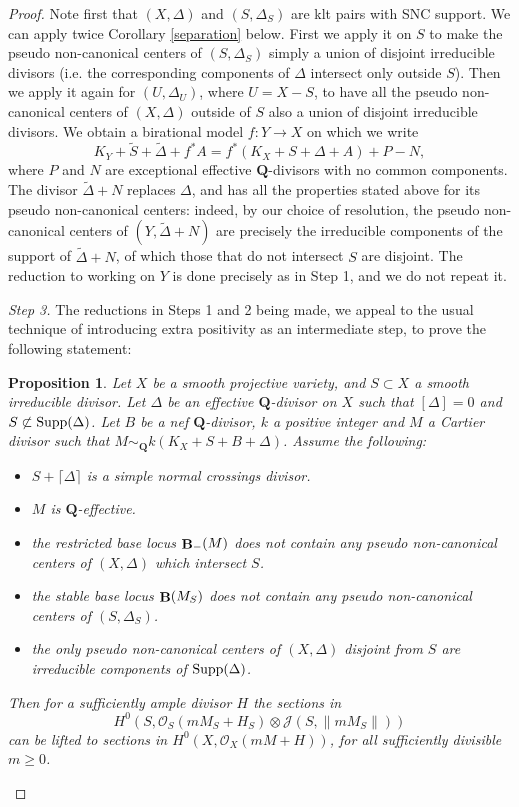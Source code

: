 \documentclass[11pt]{amsart}
\theoremstyle{plain}
\newtheorem{proposition}[theorem]{Proposition}
\theoremstyle{definition}
\newcommand{\QQ}{\mathbf{Q}}
\newcommand{\OO}{\mathcal  {O}}
\newcommand{\JJ}{\mathcal  {J}}
\DeclareMathOperator{\BB}{{\bf B}}
\begin{document}
\begin{proof}
Note first that $(X, \Delta)$ and $(S, \Delta_S)$ are klt pairs with SNC support. 
We can apply twice Corollary \ref{separation} below. First we apply it on $S$ to make 
the pseudo non-canonical centers of $(S, \Delta_S)$ simply a union of disjoint irreducible divisors (i.e. the 
corresponding components of $\Delta$ intersect only outside $S$). Then we apply it again for $(U, \Delta_U)$,
where $U = X - S$, to have all the pseudo non-canonical centers of $(X, \Delta)$ outside of $S$ also a union of disjoint irreducible divisors.
We obtain a birational model $f: Y \rightarrow X$ on which we write 
$$K_Y + \tilde S + \tilde \Delta + f^*A = f^* (K_X  + S + \Delta + A) + P - N,$$
where $P$ and $N$ are exceptional effective $\QQ$-divisors with no common components. 
The divisor $\tilde \Delta + N$ replaces $\Delta$, and has all the properties stated above for 
its pseudo non-canonical centers: indeed, by our choice of resolution, the pseudo non-canonical centers of 
$(Y, \tilde \Delta + N)$ are precisely the irreducible components of the support of 
$\tilde \Delta + N$, of which those that do not intersect $S$ are disjoint. The reduction to working on $Y$ is 
done precisely as in Step 1, and we do not repeat it.


\noindent
\emph{Step 3.} 
The reductions in Steps 1 and 2 being made, we appeal to the usual technique of introducing extra positivity as an intermediate step, to prove the following statement:

\begin{proposition}\label{intermediate}
Let $X$ be a smooth projective variety, and $S\subset X$ a smooth irreducible divisor. Let $\Delta$ be an effective $\QQ$-divisor on $X$ such that $[\Delta] = 0$ and $S \not \subset {\rm Supp}(\Delta)$. Let $B$ be a nef $\QQ$-divisor, $k$ a positive integer and $M$ a Cartier divisor such that $M \sim_{\QQ} k(K_X + S + B + \Delta)$. Assume the following:
\begin{itemize}
\item $S + \lceil \Delta \rceil$ is a simple normal crossings divisor. 
\item $M$ is $\QQ$-effective.
\item the restricted base locus $\BB_{-} (M)$ does not contain any pseudo non-canonical centers of $(X, \Delta)$ which intersect $S$.
\item the stable base locus  $\BB (M_S)$ does not contain any pseudo non-canonical centers of 
$(S, \Delta_S)$.
\item the only pseudo non-canonical centers of $(X, \Delta)$ disjoint from $S$ are irreducible components of ${\rm Supp}(\Delta)$.
\end{itemize}
Then for a sufficiently ample divisor $H$ the sections in  
$$H^0 (S, \OO_S(mM_S+ H_S)\otimes \JJ(S, \parallel mM_S \parallel))$$
can be lifted to sections in $H^0 (X, \OO_X(mM+ H))$, for all sufficiently divisible $m\ge 0$. 
\end{proposition}


\end{proof}
\end{document}
